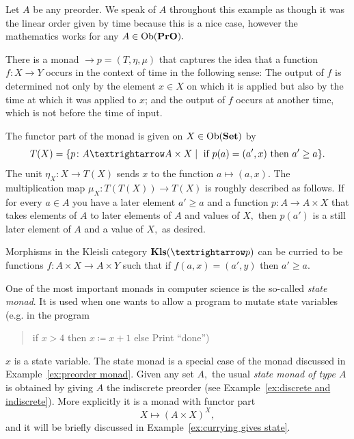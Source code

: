 \documentclass[../main/CT4S-EN-RU]{subfiles}
\begin{document}
\begin{exampleENG}\label{ex:preorder monad}
Let $A$ be any preorder. We speak of $A$ throughout this example as though it was the linear order given by time because this is a nice case, however the mathematics works for any $A\in\operatorname{Ob}({\mathbf{PrO}}).$ 

There is a monad ${→}p=(T,\eta,\mu)$ that captures the idea that a function $f\colon X{→} Y$ occurs in the context of time in the following sense: The output of $f$ is determined not only by the element $x\in X$ on which it is applied but also by the time at which it was applied to $x$; and the output of $f$ occurs at another time, which is not before the time of input.

The functor part of the monad is given on $X\in\operatorname{Ob}({\mathbf{Set}})$ by
$$T(X)=\{p\colon A{→} A\times X{\;|\;}\tn{ if } p(a)=(a',x)\tn{ then } a'\geq a\}.$$
The unit $\eta_X\colon X{→} T(X)$ sends $x$ to the function $a\mapsto (a,x).$ The multiplication map $\mu_X\colon T(T(X)){→} T(X)$ is roughly described as follows. If for every $a\in A$ you have a later element $a'\geq a$ and a function $p\colon A{→} A\times X$ that takes elements of $A$ to later elements of $A$ and values of $X,$ then $p(a')$ is a still later element of $A$ and a value of $X,$ as desired.

Morphisms in the Kleisli category $\Kls({→}p)$ can be curried to be functions $f\colon A\times X{→} A\times Y$ such that if $f(a,x)=(a',y)$ then $a'\geq a.$ 
\end{exampleENG}

\begin{exampleRUS}\label{ex:preorder monad}
\end{exampleRUS}

\begin{remarkENG}\label{rem:state monad}
One of the most important monads in computer science is the so-called {\em state monad}. It is used when one wants to allow a program to mutate state variables (e.g. in the program 
\begin{quote}if $x>4$ then $x{\coloneqq}x+1$ else Print “done”)\end{quote}
$x$ is a state variable. The state monad is a special case of the monad discussed in Example~\ref{ex:preorder monad}. Given any set $A,$ the usual {\em state monad of type $A$} is obtained by giving $A$ the indiscrete preorder (see Example~\ref{ex:discrete and indiscrete}). More explicitly it is a monad with functor part $$X\mapsto (A\times X)^X,$$ and it will be briefly discussed in Example~\ref{ex:currying gives state}.
\end{remarkENG}
\end{document}
